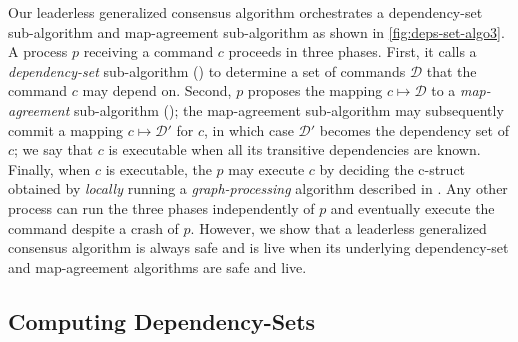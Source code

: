 Our leaderless generalized consensus algorithm orchestrates a dependency-set sub-algorithm and map-agreement sub-algorithm as shown in \cref{fig:deps-set-algo3}.
A process $p$ receiving a command $c$ proceeds in three phases. First, it calls a \textit{dependency-set} sub-algorithm () to determine a set of commands $\mathcal{D}$ that the command $c$ may depend on. Second, $p$ proposes the mapping  $c\mapsto \mathcal{D}$ to a \textit{map-agreement} sub-algorithm (); the map-agreement sub-algorithm may subsequently commit a mapping $c\mapsto \mathcal{D}'$ for $c$, in which case $\mathcal{D}'$ becomes the dependency set of $c$;
we say that $c$ is executable when all its transitive dependencies are known. %
Finally, when $c$ is executable, the $p$ may execute $c$ by deciding the c-struct obtained by \emph{locally} running a \emph{graph-processing} algorithm described in .
Any other process can run the three phases independently of $p$ and eventually execute the command despite a crash of $p$.
However, we show that a leaderless  generalized consensus algorithm is always safe and is live when its underlying dependency-set and map-agreement algorithms are safe and live.



\subsection{Computing Dependency-Sets}
\label{dep-algo}

